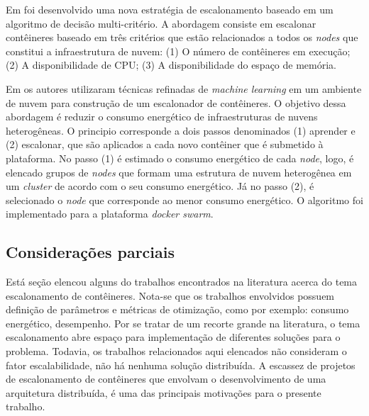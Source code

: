 Em  foi desenvolvido uma nova estratégia de escalonamento baseado em um algoritmo de decisão multi-critério. A abordagem consiste em escalonar contêineres baseado em três critérios que estão relacionados a todos os \textit{nodes}  que constitui a infraestrutura de nuvem: (1) O número de contêineres em execução; (2) A disponibilidade de CPU; (3) A disponibilidade do espaço de memória.

Em  os autores utilizaram técnicas refinadas de \textit{machine learning} em um ambiente de nuvem para construção de um escalonador de contêineres. O objetivo dessa abordagem é reduzir o consumo energético de infraestruturas de nuvens heterogêneas. O principio corresponde a dois passos denominados (1) aprender e (2) escalonar, que são aplicados a cada novo contêiner que é submetido à plataforma. No passo (1) é estimado o consumo energético de cada \textit{node}, logo, é elencado grupos de \textit{nodes} que formam uma estrutura de nuvem heterogênea em um \textit{cluster} de acordo com o seu consumo energético.
Já no passo (2), é selecionado o \textit{node} que corresponde  ao menor consumo energético. O algoritmo foi implementado para a plataforma \textit{docker swarm}.

\subsection{Considerações parciais}
Está seção elencou alguns do trabalhos encontrados na literatura acerca do tema escalonamento de contêineres. Nota-se que os trabalhos envolvidos possuem definição de parâmetros e métricas de otimização, como por exemplo: consumo energético, desempenho. Por se tratar de um recorte grande na literatura, o tema escalonamento abre espaço para implementação de diferentes soluções para o problema. Todavia, os trabalhos relacionados aqui elencados não consideram o fator escalabilidade, não há nenhuma solução distribuída. A escassez de projetos de escalonamento de contêineres que envolvam o desenvolvimento de uma arquitetura distribuída, é uma das principais motivações para o presente trabalho.

